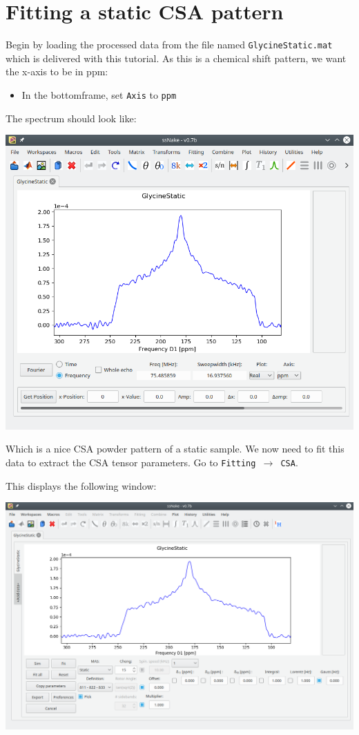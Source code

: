 \documentclass[11pt,a4paper]{article}
\begin{document}
\section{Fitting a static CSA pattern}
Begin by loading the processed data from the file named \texttt{GlycineStatic.mat} which is delivered with this tutorial.
As this is a chemical shift pattern, we want the x-axis to be in ppm:
\begin{itemize}
  \item In the bottomframe, set \texttt{Axis} to \texttt{ppm}
\end{itemize}
The spectrum should look like:
\begin{center}
\includegraphics[width=0.8\linewidth]{Figs/Fig1.png}
\end{center}
Which is a nice CSA powder pattern of a static sample. We now need to fit this data to extract the
CSA tensor parameters.
Go to \texttt{Fitting $\longrightarrow$ CSA}.

This displays the following window:
\begin{center}
\includegraphics[width=0.8\linewidth]{Figs/Fig2.png}
\end{center}
\end{document}

